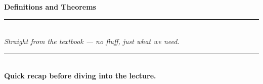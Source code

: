 \begin{titlepage}
    \null %
    \vfill
    \begin{center}
        {\Huge \textbf{Definitions and Theorems}} \\[20pt]
        \rule{\textwidth}{0.5mm} \\[15pt]
        {\Large \textit{Straight from the textbook — no fluff, just what we need.}} \\[15pt]
        \rule{\textwidth}{0.5mm} \\[15pt]
        \textbf{Quick recap before diving into the lecture.}
    \end{center}
    \vfill
\end{titlepage}
